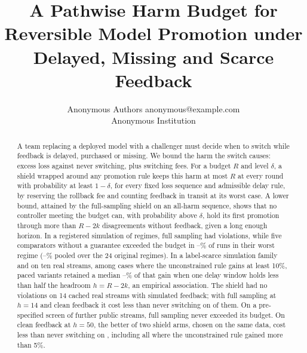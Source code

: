 \documentclass[10pt]{article}
\title{A Pathwise Harm Budget for Reversible Model Promotion under Delayed, Missing and Scarce Feedback}
\author{\name Anonymous Authors \email anonymous@example.com \\
      \addr Anonymous Institution}
\theoremstyle{plain}
\theoremstyle{definition}
\begin{document}
\maketitle

\begin{abstract}
A team replacing a deployed model with a challenger must decide when to switch while feedback is delayed, purchased or missing. We bound the harm the switch causes: excess loss against never switching, plus switching fees. For a budget $R$ and level $\delta$, a shield wrapped around any promotion rule keeps this harm at most $R$ at every round with probability at least $1-\delta$, for every fixed loss sequence and admissible delay rule, by reserving the rollback fee and counting feedback in transit at its worst case. A lower bound, attained by the full-sampling shield on an all-harm sequence, shows that no controller meeting the budget can, with probability above $\delta$, hold its first promotion through more than $R-2k$ disagreements without feedback, given a long enough horizon. In a registered simulation of \NRegimes{} regimes, full sampling had \COneTotal{} violations, while five comparators without a guarantee exceeded the budget in \CThreeMinWorst--\CThreeMaxWorst\% of runs in their worst regime (\OrigExceedMin--\OrigExceedMax\% pooled over the 24 original regimes). In a label-scarce simulation family and on ten real streams, among cases where the unconstrained rule gains at least 10\%, paced variants retained a median \KeepLo--\KeepHi\% of that gain when one delay window holds less than half the headroom $h=R-2k$, an empirical association. The shield had no violations on 14 cached real streams with simulated feedback; with full sampling at $h=14$ and clean feedback it cost less than never switching on \StreamsBetterFull{} of them. On a pre-specified screen of \ScreenPool{} further public streams, full sampling never exceeded its budget. On clean feedback at $h=50$, the better of two shield arms, chosen on the same data, cost less than never switching on \ScreenSupported{}, including all \ScreenGainful{} where the unconstrained rule gained more than 5\%.
\end{abstract}
\end{document}
